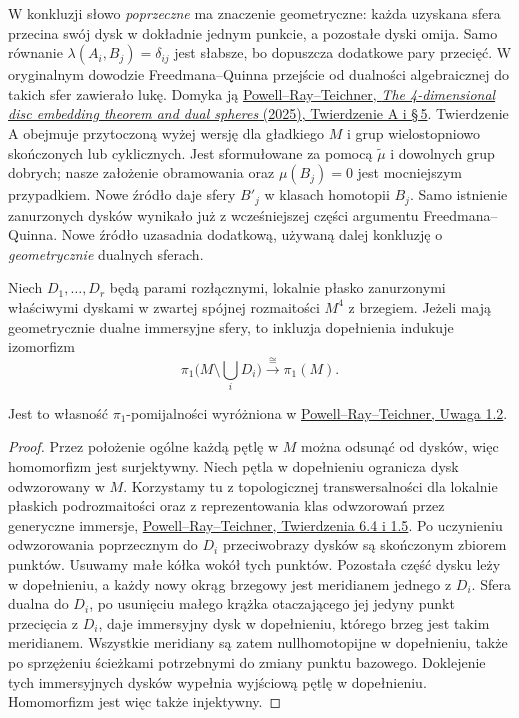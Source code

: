 W konkluzji słowo \emph{poprzeczne} ma znaczenie
geometryczne: każda uzyskana sfera przecina swój
dysk w dokładnie jednym punkcie, a pozostałe dyski
omija. Samo równanie
$\lambda(A_i,B_j)=\delta_{ij}$ jest słabsze, bo
dopuszcza dodatkowe pary przecięć. W oryginalnym
dowodzie Freedmana--Quinna przejście od dualności
algebraicznej do takich sfer zawierało lukę. Domyka
ją \href{https://arxiv.org/pdf/2006.05209}
{Powell--Ray--Teichner, \emph{The 4-dimensional disc
embedding theorem and dual spheres} (2025),
Twierdzenie A i \S\,5}. Twierdzenie A obejmuje
przytoczoną wyżej wersję dla gładkiego $M$ i grup
wielostopniowo skończonych lub cyklicznych. Jest
sformułowane za pomocą $\widetilde\mu$ i dowolnych
grup dobrych; nasze założenie obramowania oraz
$\mu(B_j)=0$ jest mocniejszym przypadkiem. Nowe
źródło daje sfery $B'_j$ w klasach homotopii $B_j$.
Samo istnienie
zanurzonych dysków wynikało już z wcześniejszej
części argumentu Freedmana--Quinna. Nowe źródło
uzasadnia dodatkową, używaną dalej konkluzję
o \emph{geometrycznie} dualnych sferach.

\begin{stwierdzenie}
\label{prop:casson-complement-pi1}
Niech $D_1,\ldots,D_r$ będą parami rozłącznymi,
lokalnie płasko zanurzonymi właściwymi dyskami w
zwartej spójnej rozmaitości $M^4$ z brzegiem.
Jeżeli mają geometrycznie
dualne immersyjne sfery, to inkluzja dopełnienia
indukuje izomorfizm
\[
 \pi_1\bigl(M\setminus\textstyle\bigcup_i D_i\bigr)
       \xrightarrow{\ \cong\ }\pi_1(M).
\]
\end{stwierdzenie}

Jest to własność $\pi_1$-pomijalności wyróżniona w
\href{https://arxiv.org/pdf/2006.05209}
{Powell--Ray--Teichner, Uwaga 1.2}.
\begin{proof}
Przez położenie ogólne każdą pętlę w $M$ można
odsunąć od dysków, więc homomorfizm jest
surjektywny. Niech pętla w dopełnieniu ogranicza
dysk odwzorowany w $M$. Korzystamy tu z
topologicznej transwersalności dla lokalnie
płaskich podrozmaitości oraz z reprezentowania
klas odwzorowań przez generyczne immersje,
\href{https://arxiv.org/pdf/2006.05209}
{Powell--Ray--Teichner, Twierdzenia 6.4 i 1.5}.
Po uczynieniu odwzorowania poprzecznym do $D_i$
przeciwobrazy
dysków są skończonym zbiorem punktów. Usuwamy
małe kółka wokół tych punktów. Pozostała część
dysku leży w dopełnieniu, a każdy nowy okrąg
brzegowy jest meridianem jednego z $D_i$.
Sfera dualna do $D_i$, po usunięciu małego krążka
otaczającego jej jedyny punkt przecięcia z $D_i$,
daje immersyjny dysk w dopełnieniu, którego brzeg
jest takim meridianem. Wszystkie meridiany są
zatem nullhomotopijne w dopełnieniu, także po
sprzężeniu ścieżkami potrzebnymi do zmiany punktu
bazowego. Doklejenie tych immersyjnych dysków
wypełnia wyjściową pętlę w dopełnieniu. Homomorfizm
jest więc także injektywny.
\end{proof}

